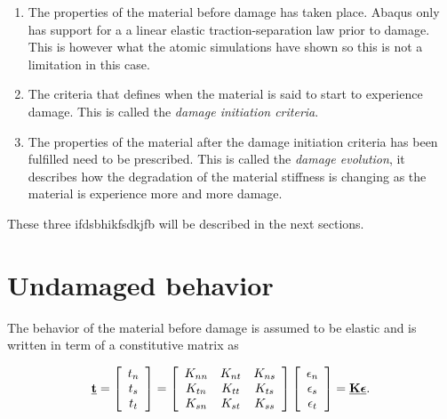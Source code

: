 \documentclass[generate_interface_elements.tex]{subfiles}
\begin{document}
\begin{enumerate}
\item The properties of the material before damage has taken place. Abaqus only has support for a a linear elastic traction-separation law prior to damage. This is however what the atomic simulations have shown so this is not a limitation in this case.

\item The criteria that defines when the material is said to start to experience damage. This is called the \textit{damage initiation criteria}.

\item The properties of the material after the damage initiation criteria has been fulfilled need to be prescribed. This is called the \textit{damage evolution}, it describes how the degradation of the material stiffness is changing as the material is experience more and more damage.
\end{enumerate}

These three ifdsbhikfsdkjfb will be described in the next sections.
 
 \section{Undamaged behavior}
 
 The behavior of the material before damage is assumed to be elastic and is written in term of a constitutive matrix as
 
 \[ \vec{t} = 
 \left[
\begin{array}{c c c}
t_n\\
t_s\\
t_t \\
\end{array} \right]
=
\left[
\begin{array}{c c c}
K_{nn} & K_{nt} & K_{ns} \\
K_{tn} & K_{tt} & K_{ts} \\
K_{sn} & K_{st} & K_{ss} \\
\end{array} \right]
 \left[
\begin{array}{c c c}
\epsilon_n\\
\epsilon_s\\
\epsilon_t \\
\end{array} \right]
= \vec{K} \vec{\epsilon}.
\]



 
 
\end{document}
